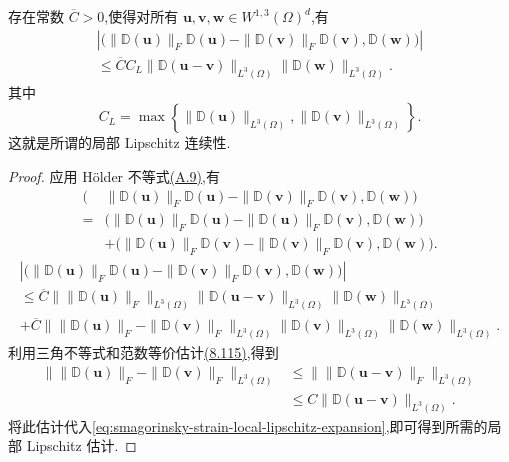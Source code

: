\begin{lemma}
\label{lem:smagorinsky-strain-local-lipschitz}
存在常数 $\overline{C}>0$,使得对所有
$\bm{u},\bm{v},\bm{w}\in W^{1,3}(\Omega)^d$,有
\begin{equation}\label{eq:smagorinsky-strain-local-lipschitz}
\begin{gathered}
 \left|
  \bigl(\|\mathbb{D}(\bm{u})\|_F\mathbb{D}(\bm{u})
       -\|\mathbb{D}(\bm{v})\|_F\mathbb{D}(\bm{v}),
       \mathbb{D}(\bm{w})\bigr)
 \right|\\
 \le \overline{C}C_L
       \|\mathbb{D}(\bm{u}-\bm{v})\|_{L^3(\Omega)}
       \|\mathbb{D}(\bm{w})\|_{L^3(\Omega)}.
\end{gathered}
\end{equation}
其中
\[
 C_L=\max\left\{
       \|\mathbb{D}(\bm{u})\|_{L^3(\Omega)},
       \|\mathbb{D}(\bm{v})\|_{L^3(\Omega)}
       \right\}.
\]
这就是所谓的局部 Lipschitz 连续性.
\begin{proof}
应用 Hölder 不等式\hyperref[eq:appendix-a-9]{(A.9)},有
\[
\begin{aligned}
 \bigl(&\|\mathbb{D}(\bm{u})\|_F\mathbb{D}(\bm{u})
       -\|\mathbb{D}(\bm{v})\|_F\mathbb{D}(\bm{v}),
       \mathbb{D}(\bm{w})\bigr)\\
 ={}&\bigl(\|\mathbb{D}(\bm{u})\|_F\mathbb{D}(\bm{u})
       -\|\mathbb{D}(\bm{u})\|_F\mathbb{D}(\bm{v}),
       \mathbb{D}(\bm{w})\bigr)\\
 &+\bigl(\|\mathbb{D}(\bm{u})\|_F\mathbb{D}(\bm{v})
       -\|\mathbb{D}(\bm{v})\|_F\mathbb{D}(\bm{v}),
       \mathbb{D}(\bm{w})\bigr).
\end{aligned}
\]
\begin{equation}\label{eq:smagorinsky-strain-local-lipschitz-expansion}
\begin{gathered}
 \left|
  \bigl(\|\mathbb{D}(\bm{u})\|_F\mathbb{D}(\bm{u})
       -\|\mathbb{D}(\bm{v})\|_F\mathbb{D}(\bm{v}),
       \mathbb{D}(\bm{w})\bigr)
 \right|\\
 \le \overline{C}
       \bigl\|\|\mathbb{D}(\bm{u})\|_F\bigr\|_{L^3(\Omega)}
       \|\mathbb{D}(\bm{u}-\bm{v})\|_{L^3(\Omega)}
       \|\mathbb{D}(\bm{w})\|_{L^3(\Omega)}\\
 +\overline{C}
       \bigl\|\|\mathbb{D}(\bm{u})\|_F
              -\|\mathbb{D}(\bm{v})\|_F\bigr\|_{L^3(\Omega)}
       \|\mathbb{D}(\bm{v})\|_{L^3(\Omega)}
       \|\mathbb{D}(\bm{w})\|_{L^3(\Omega)}.
\end{gathered}
\end{equation}
利用三角不等式和范数等价估计\hyperref[eq:smagorinsky-tensor-norm-equivalence]{(8.115)},得到
\[
\begin{aligned}
 \bigl\|\|\mathbb{D}(\bm{u})\|_F
       -\|\mathbb{D}(\bm{v})\|_F\bigr\|_{L^3(\Omega)}
 &\le \bigl\|\|\mathbb{D}(\bm{u}-\bm{v})\|_F\bigr\|_{L^3(\Omega)}\\
 &\le C\|\mathbb{D}(\bm{u}-\bm{v})\|_{L^3(\Omega)}.
\end{aligned}
\]
将此估计代入\cref{eq:smagorinsky-strain-local-lipschitz-expansion},即可得到所需的局部 Lipschitz 估计.
\end{proof}
\end{lemma}

